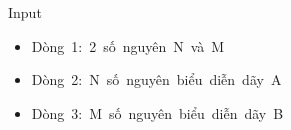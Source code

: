 Input
\begin{itemize}
	\item Dòng 1: 2 số nguyên N và M
	\item Dòng 2: N số nguyên biểu diễn dãy A
	\item Dòng 3: M số nguyên biểu diễn dãy B
\end{itemize}